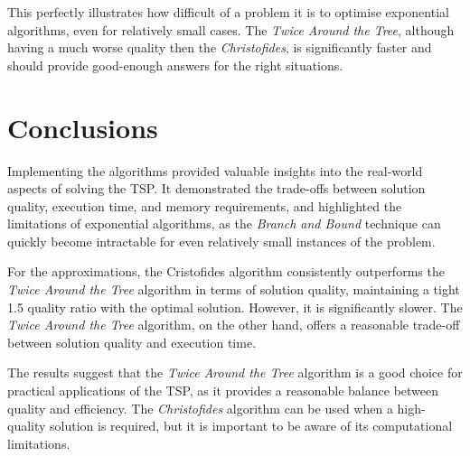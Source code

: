 \documentclass[12pt]{article}
\begin{document}
This perfectly illustrates how difficult of a problem it is to optimise exponential algorithms, even for relatively 
small cases. The \textit{Twice Around the Tree}, although having a much worse quality then the \textit{Christofides}, is 
significantly faster and should provide good-enough answers for the right situations.

\section{Conclusions} \label{sec:conclusions}

Implementing the algorithms provided valuable insights into the real-world aspects of solving the TSP. 
It demonstrated the trade-offs between solution quality, execution time, and memory requirements, 
and highlighted the limitations of exponential algorithms, as the \textit{Branch and Bound} technique can 
quickly become intractable for even relatively small instances of the problem.

For the approximations, the Cristofides algorithm consistently outperforms the \textit{Twice Around the Tree} 
algorithm in terms of solution quality, maintaining a tight 1.5 quality ratio with the optimal 
solution. However, it is significantly slower. The \textit{Twice Around the Tree} algorithm, on the other hand, 
offers a reasonable trade-off between solution quality and execution time.

The results suggest that the \textit{Twice Around the Tree} algorithm is a good choice for practical applications of the 
TSP, as it provides a reasonable balance between quality and efficiency. The \textit{Christofides} algorithm can be used 
when a high-quality solution is required, but it is important to be aware of its computational limitations.



\end{document}
